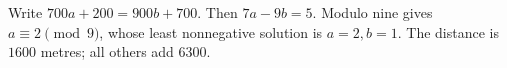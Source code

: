 Write $700a+200=900b+700$. Then $7a-9b=5$. Modulo nine gives $a\equiv2\pmod9$, whose least nonnegative solution is $a=2,b=1$. The distance is $\boxed{1600}$ metres; all others add 6300.
